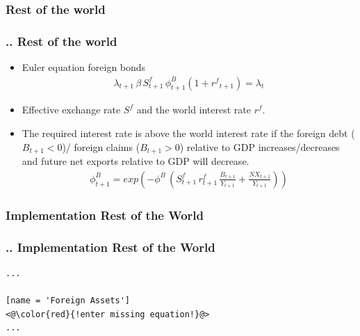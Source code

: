 \documentclass[11pt,aspectratio=169]{beamer}
\begin{document}
\subsubsection{Rest of the world}
\begin{frame}
\frametitle{{\thesection.\thesubsection.\thesubsubsection} Rest of the world}
\scriptsize
\begin{itemize}
\item Euler equation foreign bonds
\begin{align*}
\lambda_{t+1} \, \beta \, S^{f}_{t+1} \, \phi^{B}_{t+1} \left(1+{{r^{f}}_{t+1}}\right) = \lambda_{t}
\end{align*}
\item Effective exchange rate $S^f$ and the world interest rate $r^f$.
\item The required interest rate is above the world interest rate if the foreign debt ($B_{t+1}<0$)/ foreign claims ($B_{t+1}>0$) relative to GDP increases/decreases and future net exports relative to GDP will decrease. 
\begin{align*}
\phi^{B}_{t+1} = exp \left(-\phi^B \,(S^{f}_{t+1} \, r^{f}_{t+1} \, \frac{B_{t+1}}{Y_{t+1}}+\frac{NX_{t+1}}{Y_{t+1}})\right)
\end{align*}
\end{itemize}
\end{frame}

\subsubsection{Implementation Rest of the World}
\begin{frame}[fragile]
\frametitle{{\thesection.\thesubsection.\thesubsubsection} Implementation Rest of the World}

\begin{lstlisting}[frame = single]
...

[name = 'Foreign Assets']
<@\color{red}{!enter missing equation!}@>
...
\end{lstlisting}
\end{frame}
\end{document}
